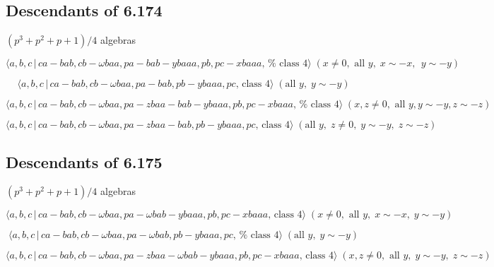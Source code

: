 \documentclass[10pt]{article}
\begin{document}
\subsection{Descendants of 6.174}

$(p^{3}+p^{2}+p+1)/4$ algebras

\begin{equation}
\langle a,b,c\,|\,ca-bab,cb-\omega baa,pa-bab-ybaaa,pb,pc-xbaaa,\,\text{%
class }4\rangle \;(x\neq 0,\text{ all }y,\;x\sim -x,\;\,y\sim -y) 
\tag{7.1778}
\end{equation}

\begin{equation}
\langle a,b,c\,|\,ca-bab,cb-\omega baa,pa-bab,pb-ybaaa,pc,\,\text{class }%
4\rangle \;(\text{all }y,\;y\sim -y)  \tag{7.1779}
\end{equation}

\begin{equation}
\langle a,b,c\,|\,ca-bab,cb-\omega baa,pa-zbaa-bab-ybaaa,pb,pc-xbaaa,\,\text{%
class }4\rangle \;(x,z\neq 0,\text{ all }y,y\sim -y,z\sim -z)  \tag{7.1780}
\end{equation}

\begin{equation}
\langle a,b,c\,|\,ca-bab,cb-\omega baa,pa-zbaa-bab,pb-ybaaa,pc,\,\text{class 
}4\rangle \;(\text{all }y,\;z\neq 0,\;y\sim -y,\;z\sim -z)  \tag{7.1781}
\end{equation}

\subsection{Descendants of 6.175}

$(p^{3}+p^{2}+p+1)/4$ algebras

\begin{equation}
\langle a,b,c\,|\,ca-bab,cb-\omega baa,pa-\omega bab-ybaaa,pb,pc-xbaaa,\,%
\text{class }4\rangle \;(x\neq 0,\text{ all }y,\;x\sim -x,\;y\sim -y) 
\tag{7.1782}
\end{equation}

\begin{equation}
\langle a,b,c\,|\,ca-bab,cb-\omega baa,pa-\omega bab,pb-ybaaa,pc,\,\text{%
class }4\rangle \;(\text{all }y,\;y\sim -y)  \tag{7.1783}
\end{equation}

\begin{equation}
\langle a,b,c\,|\,ca-bab,cb-\omega baa,pa-zbaa-\omega
bab-ybaaa,pb,pc-xbaaa,\,\text{class }4\rangle \;(x,z\neq 0,\text{ all }%
y,\;y\sim -y,\;z\sim -z)  \tag{7.1784}
\end{equation}
\end{document}
